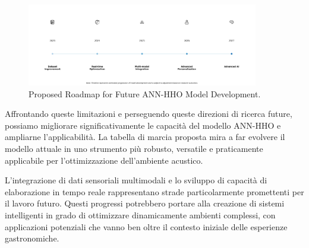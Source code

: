\begin{figure}[H]
      \centering
      \includegraphics[width=0.9\textwidth]{Chapters/Figures/improved_future_roadmap.png} 
      \caption{\small Proposed Roadmap for Future ANN-HHO Model Development.}
      \label{fig:future_roadmap}
\end{figure}

Affrontando queste limitazioni e perseguendo queste direzioni di ricerca future, possiamo migliorare significativamente le capacità del modello ANN-HHO e ampliarne l'applicabilità. La tabella di marcia proposta mira a far evolvere il modello attuale in uno strumento più robusto, versatile e praticamente applicabile per l'ottimizzazione dell'ambiente acustico.

L'integrazione di dati sensoriali multimodali e lo sviluppo di capacità di elaborazione in tempo reale rappresentano strade particolarmente promettenti per il lavoro futuro. Questi progressi potrebbero portare alla creazione di sistemi intelligenti in grado di ottimizzare dinamicamente ambienti complessi, con applicazioni potenziali che vanno ben oltre il contesto iniziale delle esperienze gastronomiche.